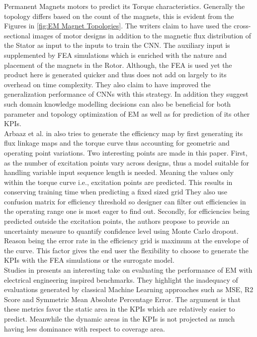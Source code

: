 \documentclass{report} %
\begin{document}
Permanent Magnets motors to predict its Torque characteristics.
Generally the topology differs based on the count of the magnets, this is evident from the Figures in \ref{fig:EM Magnet Topologies}.
The writers claim to have used the cross-sectional images of motor designs in addition to the magnetic flux distribution of the Stator as input to the
inputs to train the \ac{CNN}. The auxiliary input is supplemented by \ac{FEA} simulations which is enriched with the nature and placement of 
the magnets in the Rotor. Although, the \ac{FEA} is used yet the product here is generated quicker and thus does not add on largely to its overhead on time complexity. 
They also claim to have improved the generalization performance of \ac{CNN}s with this strategy. In addition they suggest such domain knowledge modelling decisions 
can also be beneficial for both parameter and topology optimization of \ac{EM} as well as for prediction of its other \ac{KPI}s.\\
Arbaaz et al. in \cite{DL-ETA-2019} also tries to generate the efficiency map by first generating its flux linkage maps and the torque curve 
thus accounting for geometric and operating point variations. Two interesting points are made in this paper.
First, as the number of excitation points vary across designs, thus a model suitable for handling variable input sequence length is needed.
Meaning the values only within the torque curve i.e., excitation points are predicted. This results in conserving training time when predicting a fixed sized grid
They also use confusion matrix for efficiency threshold so designer can filter out efficiencies in the operating range one is most eager to find out.
Secondly, for efficiencies being predicted outside the excitation points, the authors propose to provide an uncertainty measure to quantify confidence level using Monte Carlo dropout.
Reason being the error rate in the efficiency grid is maximum at the envelope of the curve. This factor gives the end user 
the flexibility to choose to generate the \ac{KPI}s with the \ac{FEA} simulations or the surrogate model.\\
Studies in \cite{EM-PM-2020} presents an interesting take on evaluating the performance of \ac{EM} with electrical engineering inspired benchmarks.
They highlight the inadequacy of evaluations generated by classical Machine Learning approaches such as \ac{MSE}, R2 Score and Symmetric Mean Absolute Percentage Error.
The argument is that these metrics favor the static area in the \ac{KPI}s which are relatively easier to predict.
Meanwhile the dynamic areas in the \ac{KPI}s is not projected as much having less dominance with respect to coverage area.
\end{document}
